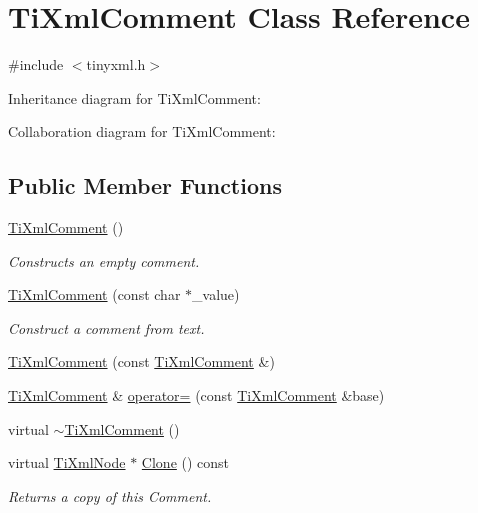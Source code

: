 \hypertarget{class_ti_xml_comment}{\section{Ti\+Xml\+Comment Class Reference}
\label{class_ti_xml_comment}
}


{\ttfamily \#include $<$tinyxml.\+h$>$}



Inheritance diagram for Ti\+Xml\+Comment\+:


Collaboration diagram for Ti\+Xml\+Comment\+:
\subsection*{Public Member Functions}
\begin{DoxyCompactItemize}
\item 
\hyperlink{class_ti_xml_comment_aaa3252031d3e8bd3a2bf51a1c61201b7}{Ti\+Xml\+Comment} ()
\begin{DoxyCompactList}\small\item\em Constructs an empty comment. \end{DoxyCompactList}\item 
\hyperlink{class_ti_xml_comment_a37e7802ef17bc03ebe5ae79bf0713d47}{Ti\+Xml\+Comment} (const char $\ast$\+\_\+value)
\begin{DoxyCompactList}\small\item\em Construct a comment from text. \end{DoxyCompactList}\item 
\hyperlink{class_ti_xml_comment_afaec41ac2760ce946ba1590eb5708e50}{Ti\+Xml\+Comment} (const \hyperlink{class_ti_xml_comment}{Ti\+Xml\+Comment} \&)
\item 
\hyperlink{class_ti_xml_comment}{Ti\+Xml\+Comment} \& \hyperlink{class_ti_xml_comment_aeceedc15f8b8f9ca0b6136696339b3ac}{operator=} (const \hyperlink{class_ti_xml_comment}{Ti\+Xml\+Comment} \&base)
\item 
virtual \hyperlink{class_ti_xml_comment_a3264ae2e9c4a127edfa03289bb2c9aa2}{$\sim$\+Ti\+Xml\+Comment} ()
\item 
virtual \hyperlink{class_ti_xml_node}{Ti\+Xml\+Node} $\ast$ \hyperlink{class_ti_xml_comment_a4f6590c9c9a2b63a48972655b78eb853}{Clone} () const 
\begin{DoxyCompactList}\small\item\em Returns a copy of this Comment. \end{DoxyCompactList}\item 

\end{DoxyCompactItemize}
